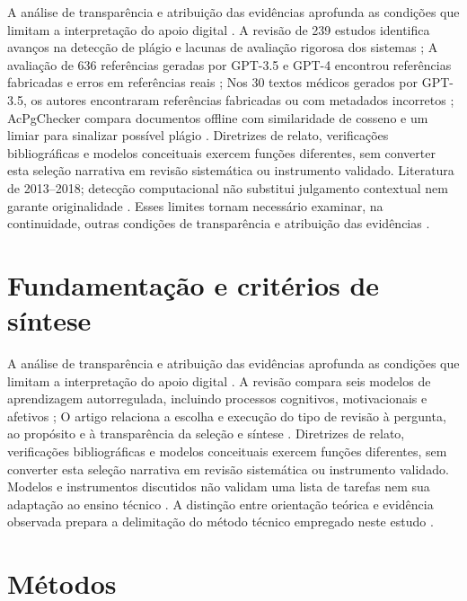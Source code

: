 A análise de transparência e atribuição das evidências aprofunda as condições que limitam a interpretação do apoio digital \citep{SU05} \citep{SU06} \citep{SU07} \citep{SU08}. A revisão de 239 estudos identifica avanços na detecção de plágio e lacunas de avaliação rigorosa dos sistemas \citep{SU05}; A avaliação de 636 referências geradas por GPT-3.5 e GPT-4 encontrou referências fabricadas e erros em referências reais \citep{SU06}; Nos 30 textos médicos gerados por GPT-3.5, os autores encontraram referências fabricadas ou com metadados incorretos \citep{SU07}; AcPgChecker compara documentos offline com similaridade de cosseno e um limiar para sinalizar possível plágio \citep{SU08}. Diretrizes de relato, verificações bibliográficas e modelos conceituais exercem funções diferentes, sem converter esta seleção narrativa em revisão sistemática ou instrumento validado. Literatura de 2013–2018; detecção computacional não substitui julgamento contextual nem garante originalidade \citep{SU05} \citep{SU06} \citep{SU07} \citep{SU08}. Esses limites tornam necessário examinar, na continuidade, outras condições de transparência e atribuição das evidências \citep{SU05} \citep{SU06} \citep{SU07} \citep{SU08}.

\clearpage\section{Fundamentação e critérios de síntese}

A análise de transparência e atribuição das evidências aprofunda as condições que limitam a interpretação do apoio digital \citep[p. 1, 3]{SU10} \citep[p. 336–337]{SU11}. A revisão compara seis modelos de aprendizagem autorregulada, incluindo processos cognitivos, motivacionais e afetivos \citep[p. 1, 3]{SU10}; O artigo relaciona a escolha e execução do tipo de revisão à pergunta, ao propósito e à transparência da seleção e síntese \citep[p. 336–337]{SU11}. Diretrizes de relato, verificações bibliográficas e modelos conceituais exercem funções diferentes, sem converter esta seleção narrativa em revisão sistemática ou instrumento validado. Modelos e instrumentos discutidos não validam uma lista de tarefas nem sua adaptação ao ensino técnico \citep[p. 1, 3]{SU10} \citep[p. 336–337]{SU11}. A distinção entre orientação teórica e evidência observada prepara a delimitação do método técnico empregado neste estudo \citep[p. 1, 3]{SU10} \citep[p. 336–337]{SU11}.

\clearpage\section{Métodos}

